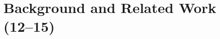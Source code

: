 \cleardoublepage
\chapter{Background and Related Work (12--15)}   %
\label{ch:background}
\label{ch:related}   %



